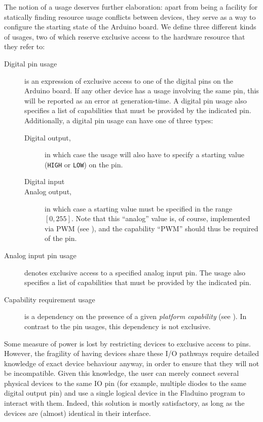 \documentclass[a4paper, oneside, final]{memoir}
\let\Fref\undefined
\begin{document}
The notion of a usage deserves further elaboration: apart from being a
facility for statically finding resource usage conflicts between
devices, they serve as a way to configure the starting state of the
Arduino board.  We define three different kinds of usages, two of which
reserve exclusive access to the hardware resource that they refer to:

\begin{description}
\item[Digital pin usage] is an expression of exclusive access to one
  of the digital pins on the Arduino board.  If any other device has a
  usage involving the same pin, this will be reported as an error at
  generation-time.  A digital pin usage also specifies a list of
  capabilities that must be provided by the indicated pin.
  Additionally, a digital pin usage can have one of three types:
  \begin{description}
  \item[Digital output,] in which case the usage will also have to
    specify a starting value (\texttt{HIGH} or \texttt{LOW}) on the
    pin.
  \item[Digital input]
  \item[Analog output,] in which case a starting value must be
    specified in the range $[0,255]$.  Note that this ``analog'' value
    is, of course, implemented via PWM (see \Fref{sec:pwm}), and the
    capability ``PWM'' should thus be required of the pin.
  \end{description}
\item[Analog input pin usage] denotes exclusive access to a specified
  analog input pin.  The usage also specifies a list of capabilities
  that must be provided by the indicated pin.
\item[Capability requirement usage] is a dependency on the presence of
  a given \textit{platform capability} (see \Fref{sec:platforms}).  In
  contrast to the pin usages, this dependency is not exclusive.
\end{description}

Some measure of power is lost by restricting devices to exclusive
access to pins.  However, the fragility of having devices share these
I/O pathways require detailed knowledge of exact device behaviour
anyway, in order to ensure that they will not be incompatible.  Given
this knowledge, the user can merely connect several physical devices
to the same IO pin (for example, multiple diodes to the same digital
output pin) and use a single logical device in the Fladuino program to
interact with them.  Indeed, this solution is mostly satisfactory, as
long as the devices are (almost) identical in their interface.
\end{document}
